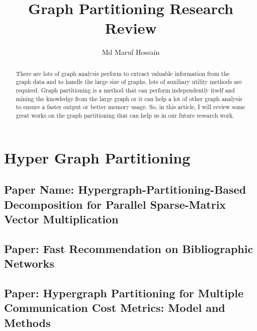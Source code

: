 \documentclass[conference, onecolumn]{IEEEtran}
\begin{document}
\title{Graph Partitioning Research Review}


\author{Md Maruf Hossain}

\maketitle

\begin{abstract}
There are lots of graph analysis perform to extract valuable information from the graph data and to handle the large 
size of graphs, lots of auxiliary utility methods are required. Graph partitioning is a method that can perform 
independently itself and mining the knowledge from the large graph or it can help a lot of other graph analysis to 
ensure a faster output or better memory usage. So, in this article, I will review some great works on the graph partitioning 
that can help us in our future research work.    
\end{abstract}

\section{Hyper Graph Partitioning}
\subsection{Paper Name: Hypergraph-Partitioning-Based Decomposition for Parallel Sparse-Matrix Vector Multiplication} 

\subsection{Paper: Fast Recommendation on Bibliographic Networks}

\subsection{Paper: Hypergraph Partitioning for Multiple Communication Cost Metrics: Model and Methods}
\end{document}
